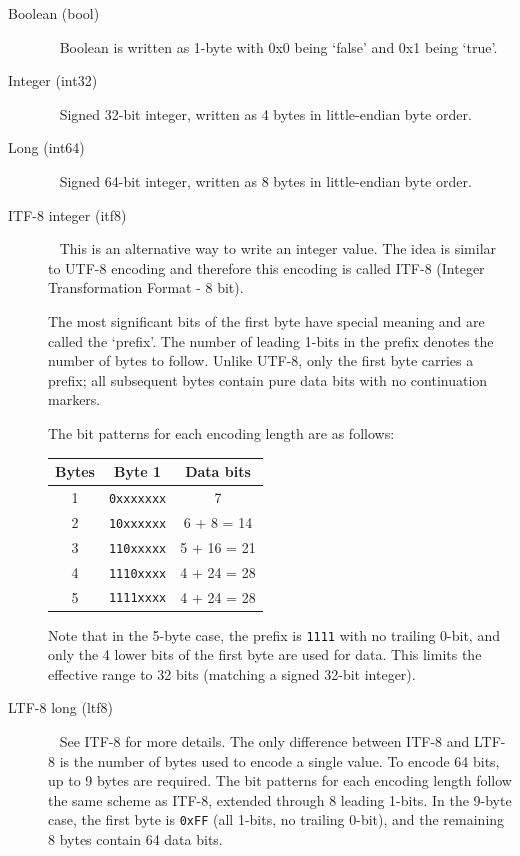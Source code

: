 \documentclass[a4paper]{article}
\begin{document}
\begin{description}

\item[Boolean (bool)]\ \newline
Boolean is written as 1-byte with 0x0 being `false' and 0x1 being `true'.

\item[Integer (int32)]\ \newline
Signed 32-bit integer, written as 4 bytes in little-endian byte order.

\item[Long (int64)]\ \newline
Signed 64-bit integer, written as 8 bytes in little-endian byte order.

\item[ITF-8 integer (itf8)]\ \newline
This is an alternative way to write an integer value. The idea is similar to UTF-8 
encoding and therefore this encoding is called ITF-8 (Integer Transformation Format 
- 8 bit). 

The most significant bits of the first byte have special meaning and are called
the `prefix'. The number of leading 1-bits in the prefix denotes the number of
bytes to follow. Unlike UTF-8, only the first byte carries a prefix;
all subsequent bytes contain pure data bits with no continuation markers.

The bit patterns for each encoding length are as follows:

\begin{tabular}{|c|c|c|}
\hline
\textbf{Bytes} & \textbf{Byte 1} & \textbf{Data bits}\tabularnewline
\hline
1 & \texttt{0xxxxxxx} & 7\tabularnewline
\hline
2 & \texttt{10xxxxxx} & 6 + 8 = 14\tabularnewline
\hline
3 & \texttt{110xxxxx} & 5 + 16 = 21\tabularnewline
\hline
4 & \texttt{1110xxxx} & 4 + 24 = 28\tabularnewline
\hline
5 & \texttt{1111xxxx} & 4 + 24 = 28\tabularnewline
\hline
\end{tabular}

\noindent Note that in the 5-byte case, the prefix is \texttt{1111} with no trailing 0-bit,
and only the 4 lower bits of the first byte are used for data. This limits the
effective range to 32 bits (matching a signed 32-bit integer).

\item[LTF-8 long (ltf8)]\ \newline
See ITF-8 for more details. The only difference between ITF-8 and LTF-8 is the
number of bytes used to encode a single value. To encode 64 bits, up to
9 bytes are required. The bit patterns for each encoding length follow the same
scheme as ITF-8, extended through 8 leading 1-bits. In the 9-byte case, the
first byte is \texttt{0xFF} (all 1-bits, no trailing 0-bit), and the remaining
8 bytes contain 64 data bits.


\end{description}
\end{document}
